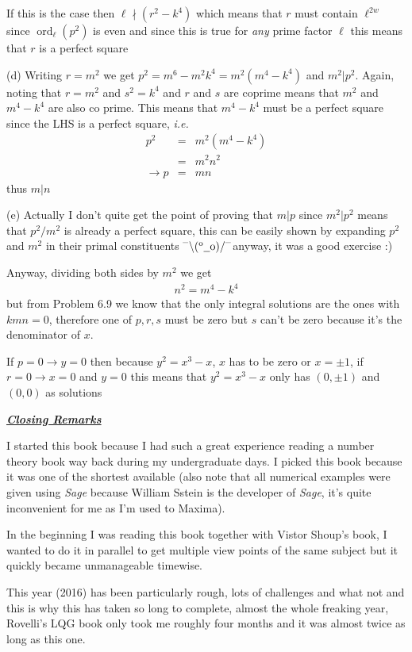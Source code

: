 \documentclass[aps,preprint,preprintnumbers,nofootinbib,showpacs,prd]{revtex4-1}
\newcommand{\ie}{{\it i.e.} }
\newcommand{\nbea}{\begin{eqnarray*}}
\newcommand{\neea}{\end{eqnarray*}}
\newcommand{\dunno}{$ {}^{\mbox {--}}\backslash(^{\rm o}{}\underline{\hspace{0.2cm}}{\rm o})/^{\mbox {--}}$}
\DeclareMathOperator{\ord}{ord}
\begin{document}
If this is the case then $\ell \nmid (r^2 - k^4)$ which means that $r$ must contain $\ell^{2w}$ since $\ord_\ell(p^2)$ is even and since this is true for {\it any} prime factor $\ell$ this means that $r$ is a perfect square

(d) Writing $r = m^2$ we get $p^2 = m^6 - m^2 k^4 = m^2(m^4 - k^4)$ and $m^2|p^2$. Again, noting that $r = m^2$ and $s^2 = k^4$ and $r$ and $s$ are coprime means that $m^2$ and $m^4 - k^4$ are also co prime. This means that $m^4 - k^4$ must be a perfect square since the LHS is a perfect square, \ie
%
\nbea
p^2 & = & m^2 (m^4 - k^4) \\
& = & m^2 n^2 \\
\to p & = & mn
\neea
%
thus $m|n$

(e) Actually I don't quite get the point of proving that $m|p$ since $m^2|p^2$ means that $p^2/m^2$ is already a perfect square, this can be easily shown by expanding $p^2$ and $m^2$ in their primal constituents \dunno anyway, it was a good exercise :)

Anyway, dividing both sides by $m^2$ we get
%
\nbea
n^2 = m^4 - k^4
\neea
%
but from Problem 6.9 we know that the only integral solutions are the ones with $kmn = 0$, therefore one of $p, r, s$ must be zero but $s$ can't be zero because it's the denominator of $x$.

If $p = 0 \to y = 0$ then because $y^2 = x^3 - x$, $x$ has to be zero or $x = \pm1$, if $r = 0 \to x = 0$ and $y=0$ this means that $y^2 = x^3 - x$ only has $(0, \pm1)$ and $(0,0)$ as solutions

\bigskip
\underline{\textbf{\textit{Closing Remarks}}}
\bigskip

I started this book because I had such a great experience reading a number theory book way back during my undergraduate days. I picked this book because it was one of the shortest available (also note that all numerical examples were given using {\it Sage} because William Sstein is the developer of {\it Sage}, it's quite inconvenient for me as I'm used to Maxima).

In the beginning I was reading this book together with Vistor Shoup's book, I wanted to do it in parallel to get multiple view points of the same subject but it quickly became unmanageable timewise.

This year (2016) has been particularly rough, lots of challenges and what not and this is why this has taken so long to complete, almost the whole freaking year, Rovelli's LQG book only took me roughly four months and it was almost twice as long as this one.
\end{document}
